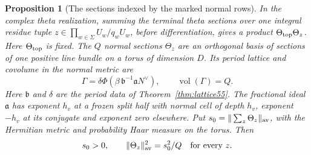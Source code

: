 \documentclass[a4paper,11pt]{article}
\newtheorem{proposition}{Proposition}[section]
\theoremstyle{definition}
\theoremstyle{remark}
\numberwithin{equation}{section}
\begin{document}
\begin{proposition}[The sections indexed by the marked normal rows]
\label{prop:normalcells388}
In the complex theta realization, summing the terminal theta
sections over one integral residue tuple
\(z\in\prod_{w\in\Sigma} U_w/q_w U_w\), before differentiation,
gives a product
\(\Theta_{\rm top}\Theta_z\). Here \(\Theta_{\rm top}\) is fixed.
The \(Q\) normal sections \(\Theta_z\) are an orthogonal basis of
sections of one positive line bundle on a torus of dimension \(D\).
Its period lattice and covolume in the normal metric are
\[
 \Gamma=\delta\Phi(\beta\,\mathfrak b^{-1}\mathfrak a N^\vee),
 \qquad \operatorname{vol}(\Gamma)=Q .
\]
Here \(\mathfrak b\) and \(\delta\) are the period data of
Theorem~\ref{thm:lattice55}. The fractional ideal \(\mathfrak a\)
has exponent \(h_v\) at a frozen split half with normal cell of
depth \(h_v\), exponent \(-h_v\) at its conjugate and exponent zero
elsewhere. Put \(s_0=\|\sum_z\Theta_z\|_{\rm av}\), with the
Hermitian metric and probability Haar measure on the torus. Then
\[
     s_0>0,\qquad \|\Theta_z\|_{\rm av}^2=s_0^2/Q
                       \quad\text{for every }z .
\]
\end{proposition}
\end{document}
